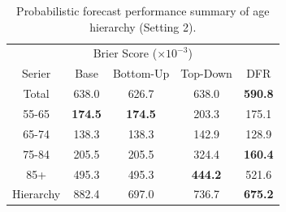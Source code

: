 \documentclass[a4paper,review,12pt,authoryear]{elsarticle}
\begin{document}
\begin{table}[h]
  \centering
  \caption{\label{tab:mortality_age2} Probabilistic forecast performance summary of age hierarchy (Setting 2).}
  \begin{tabular}{ccccc}
  \toprule
  \multicolumn{5}{c}{Brier Score ($\times 10^{-3}$)}\\ 
  Serier & Base & Bottom-Up & Top-Down & DFR \\\midrule
  Total & 638.0 & 626.7 & 638.0 & \textbf{590.8} \\
  55-65 & \textbf{174.5} & \textbf{174.5} & 203.3 & 175.1 \\
  65-74 & 138.3 & 138.3 & 142.9 & 128.9\\
  75-84 & 205.5 & 205.5 & 324.4 & \textbf{160.4}\\
  85+ & 495.3 & 495.3 & \textbf{444.2} & 521.6\\
  Hierarchy & 882.4 & 697.0 & 736.7 & \textbf{675.2} \\
  \bottomrule
 \end{tabular}
\end{table}


\newpage



\end{document}
